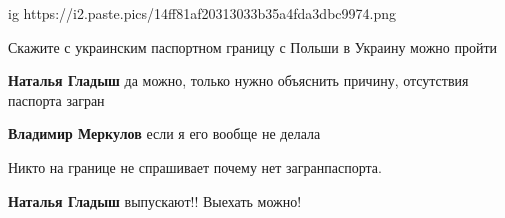  
 
 
 
 
\zzSecCmt

\raggedcolumns
\begin{multicols}{2} %
\setlength{\parindent}{0pt}

\ifcmt
  ig https://i2.paste.pics/14ff81af20313033b35a4fda3dbc9974.png
\fi

Скажите с украинским паспортном границу с Польши в Украину можно пройти

\textbf{Наталья Гладыш} да можно, только нужно объяснить причину, отсутствия паспорта загран

\textbf{Владимир Меркулов} если я его вообще не делала

Никто на границе не спрашивает почему нет загранпаспорта.

\textbf{Наталья Гладыш} выпускают!! Выехать можно!


\end{multicols} %
